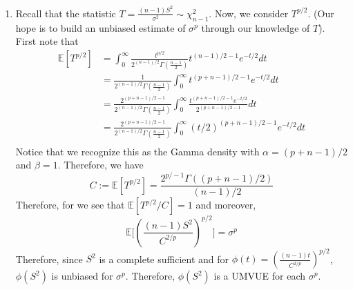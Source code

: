 \documentclass[12pt]{article}  %
\newcommand{\E}{{\mathbb{E}}}
\begin{document}
\begin{enumerate}
\item Recall that the statistic $T = \frac{(n-1)S^2}{\sigma^2}\sim\chi^2_{n-1}$. Now, we consider $T^{p/2}$. (Our hope is to build an unbiased estimate of $\sigma^p$ through our knowledge of $T$). First note that 
\begin{align*}
\E[T^{p/2}] &= \int_{0}^{\infty}\frac{t^{p/2}}{2^{(n-1)/2}\Gamma(\frac{n-1}{2})}t^{(n-1)/2 -1}e^{-t/2}dt\\
&= \frac{1}{2^{(n-1)/2}\Gamma(\frac{n-1}{2})}\int_{0}^{\infty}t^{(p+n-1)/2 -1}e^{-t/2}dt\\
&= \frac{2^{(p+ n-1)/2 - 1}}{2^{(n-1)/2}\Gamma(\frac{n-1}{2})}\int_{0}^{\infty}\frac{t^{(p+n-1)/2 -1}e^{-t/2}}{2^{(p+ n-1)/2 - 1}}dt\\
&= \frac{2^{(p+ n-1)/2 - 1}}{2^{(n-1)/2}\Gamma(\frac{n-1}{2})}\int_{0}^{\infty}(t/2)^{(p+n-1)/2 -1}e^{-t/2}dt\\
\end{align*}
Notice that we recognize this as the Gamma density with $\alpha = (p+n-1)/2$ and $\beta = 1$. Therefore, we have $$C:= \E[T^{p/2}] = \frac{2^{p/-1}\Gamma((p+n-1)/2)}{(n-1)/2}$$
Therefore, for we see that $\E[T^{p/2}/C] = 1$ and moreover, $$\E\Big[\left(\frac{(n-1)S^2}{C^{2/p}}\right)^{p/2}\Big] = \sigma^p$$ Therefore, since $S^2$ is a complete sufficient and for $\phi(t) = \left(\frac{(n-1)t}{C^{2/p}}\right)^{p/2}$, $\phi(S^2)$ is unbiased for $\sigma^p$. Therefore, $\phi(S^2)$ is a UMVUE for each $\sigma^p$. 




\end{enumerate}
\end{document}
